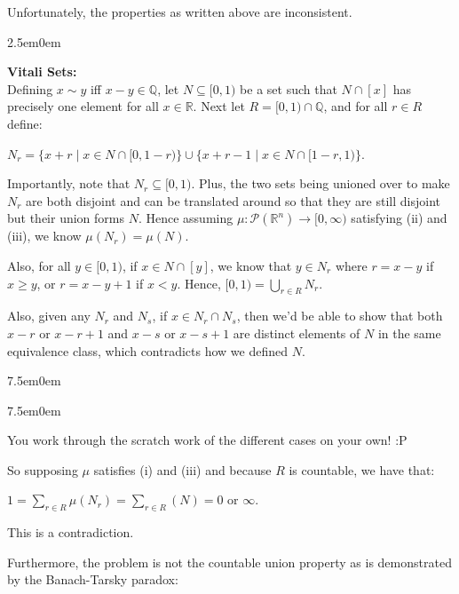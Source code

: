 \documentclass{book}
\newcommand{\hTwo}{%
\color{MidnightBlue}%
   \fontsize{13}{15}\selectfont%
}
\newcommand{\myComment}{%
   \color{RawerSienna}%
   \fontsize{12}{14}\selectfont%
}
\newenvironment{myIndent}{%
   \begin{adjustwidth}{2.5em}{0em}%
}{%
   \end{adjustwidth}%
}
\newenvironment{myTindent}{%
   \begin{adjustwidth}{7.5em}{0em}%
}{%
   \end{adjustwidth}%
}
\newcommand{\blab}[1]{\textbf{#1}}
\newcommand{\retTwo}{\hfill\bigbreak}
\begin{document}
Unfortunately, the properties as written above are inconsistent.

\begin{myIndent}\hTwo
   \blab{Vitali Sets:}\\
   Defining $x \sim y$ iff $x - y \in \mathbb{Q}$, let $N \subseteq [0, 1)$ be a set such that $N \cap [x]$ has precisely one element for all $x \in \mathbb{R}$. Next let $R = [0, 1) \cap \mathbb{Q}$, and for all $r \in R$ define:
   
   {\centering$N_r = \{x + r \mid x \in N \cap [0, 1-r)\}\cup \{x + r - 1 \mid x \in N \cap [1 - r, 1)\} $.\retTwo\par}

   Importantly, note that $N_r \subseteq [0, 1)$. Plus, the two sets being unioned over to make $N_r$ are both disjoint and can be translated around so that they are still disjoint but their union forms $N$. Hence assuming $\mu : \mathcal{P}(\mathbb{R}^n) \longrightarrow [0, \infty)$ satisfying (ii) and (iii), we know $\mu(N_r) = \mu(N)$.\retTwo

   Also, for all $y \in [0, 1)$, if $x \in N \cap [y]$, we know that $y \in N_r$ where $r = x - y$ if $x \geq y$, or $r = x - y + 1$ if $x < y$. Hence, $[0, 1) = \bigcup\limits_{r \in R}N_r$.\retTwo

   Also, given any $N_r$ and $N_s$, if $x \in N_r \cap N_s$, then we'd be able to show that both $x - r$ or $x - r + 1$ and $x - s$ or $x - s + 1$ are distinct elements of $N$ in the same equivalence class, which contradicts how we defined $N$.
   \begin{myTindent}\begin{myTindent}\myComment
      You work through the scratch work of the different cases on your own! :P\retTwo
   \end{myTindent}\end{myTindent}

   So supposing $\mu$ satisfies (i) and (iii) and because $R$ is countable, we have that:
   
   {\centering $1 = \sum\limits_{r \in R}\mu(N_r) = \sum\limits_{r \in R}(N) = 0 \text{ or } \infty$.\retTwo\par}

   This is a contradiction.\retTwo
\end{myIndent}

Furthermore, the problem is not the countable union property as is demonstrated by the Banach-Tarsky paradox:\newpage
\end{document}
